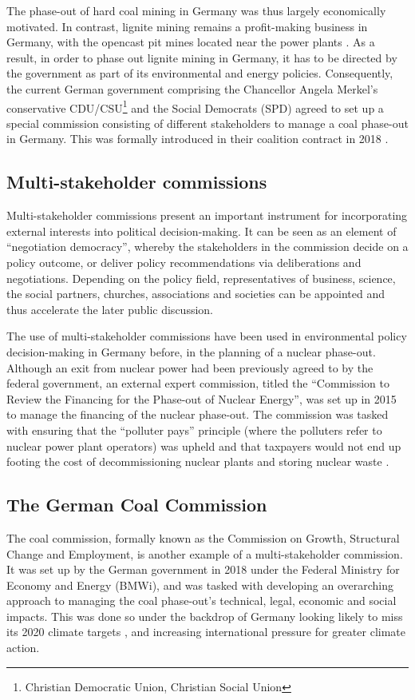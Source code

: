 \documentclass[12pt,onecolumn,twoside]{layout}
\begin{document}
The phase-out of hard coal mining in Germany was thus largely economically motivated. In contrast, lignite mining remains a profit-making business in Germany, with the opencast pit mines located near the power plants \citep{Appunn2019}. As a result, in order to phase out lignite mining in Germany, it has to be directed by the government as part of its environmental and energy policies. Consequently, the current German government comprising the Chancellor Angela Merkel's conservative CDU/CSU\footnote{Christian Democratic Union, Christian Social Union} and the Social Democrats (SPD) agreed to set up a special commission consisting of different stakeholders to manage a coal phase-out in Germany. This was formally introduced in their coalition contract in 2018 \citep{Wehrmann2018}.

\subsection*{Multi-stakeholder commissions}
Multi-stakeholder commissions present an important instrument for incorporating external interests into political decision-making. It can be seen as an element of ``negotiation democracy'', whereby the stakeholders in the commission decide on a policy outcome, or deliver policy recommendations via deliberations and negotiations. Depending on the policy field, representatives of business, science, the social partners, churches, associations and societies can be appointed and thus accelerate the later public discussion. \citep{Siefken2016}

The use of multi-stakeholder commissions have been used in environmental policy decision-making in Germany before, in the planning of a nuclear phase-out. Although an exit from nuclear power had been previously agreed to by the federal government, an external expert commission, titled the ``Commission to Review the Financing for the Phase-out of Nuclear Energy'', was set up in 2015 to manage the financing of the nuclear phase-out. The commission was tasked with ensuring that the ``polluter pays'' principle (where the polluters refer to nuclear power plant operators) was upheld and that taxpayers would not end up footing the cost of decommissioning nuclear plants and storing nuclear waste \citep{Appunn2017}.

\subsection*{The German Coal Commission}
The coal commission, formally known as the Commission on Growth, Structural Change and Employment, is another example of a multi-stakeholder commission. It was set up by the German government in 2018 under the Federal Ministry for Economy and Energy (BMWi), and was tasked with developing an overarching approach to managing the coal phase-out’s technical, legal, economic and social impacts. This was done so under the backdrop of Germany looking likely to miss its 2020 climate targets \citep{der2017projektionsbericht}, and increasing international pressure for greater climate action.
\end{document}
